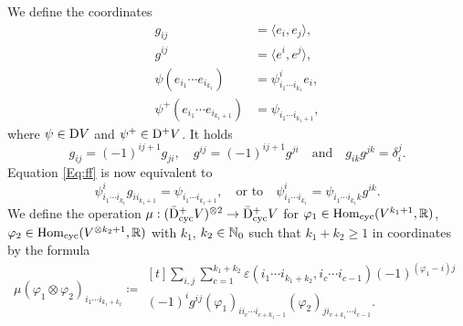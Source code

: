 \documentclass[\MainFolder/Text.tex]{subfiles}
\begin{document}
We define the coordinates
\begin{align*}
g_{ij} &= \langle e_i,e_j\rangle, \\
g^{ij} &= \langle e^i, e^j\rangle, \\
\psi(e_{i_1}\dotsb e_{i_{k_1}}) &= \psi_{i_1 \dotsb i_{k_1}}^i e_i, \\
\psi^+(e_{i_1}\dotsb e_{i_{k_1+1}}) & = \psi_{i_1 \dotsb i_{k_1 + 1}},
\end{align*}
where $\psi\in\mathrm{D} V$ and $\psi^+\in\mathrm{D}^+ V$. It holds
$$ g_{ij} = (-1)^{i j + 1} g_{ji}, \quad g^{ij} = (-1)^{ij + 1} g^{ji} \quad \text{and}\quad g_{ik}g^{jk} = \delta_i^j. $$ 
Equation \eqref{Eq:ff} is now equivalent to 
\begin{equation}\label{Eq:TransfForm}
\psi^i_{i_1 \dotsb i_{k_1}} g_{i i_{k_1+1}}  = \psi_{i_1\dotsb i_{k_1 + 1}},\quad\text{or to}\quad \psi^i_{i_1\dotsb i_{k_1}} = \psi_{i_1 \dotsb i_{k_1} k} g^{ik}.
\end{equation}
We define the operation $\mu: (\bar{\mathrm{D}}^+_{\mathrm{cyc}} V)^{\otimes 2} \rightarrow \bar{\mathrm{D}}^+_{\mathrm{cyc}} V$ for $\varphi_1\in \mathrm{Hom}_{\mathrm{cyc}}(V^{k_1 + 1},\mathbb{R})$, $\varphi_2\in \mathrm{Hom}_{\mathrm{cyc}}(V^{\otimes k_2 + 1},\mathbb{R})$ with $k_1$, $k_2\in \mathbb{N}_0$ such that $k_1+k_2 \ge 1$ in coordinates by the formula 
\begin{equation}\label{Eq:CoordFormula}
\mu(\varphi_1 \otimes \varphi_2)_{i_1 \dotsb i_{k_1 + k_2}} \coloneqq\begin{multlined}[t] 
\sum_{i,j}\sum_{c=1}^{k_1 + k_2} \varepsilon(i_1 \dotsb i_{k_1 + k_2},i_c \dotsb i_{c-1})(-1)^{(\varphi_1 - i)j} \\ (-1)^i g^{ij} (\varphi_1)_{i i_c \dotsb i_{c+k_1-1}} (\varphi_2)_{j i_{c+k_1} \dotsb i_{c-1}}.
\end{multlined}
\end{equation}
\end{document}
